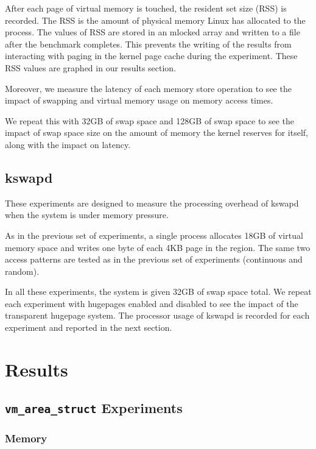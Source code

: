 \documentclass[twocolumn,11pt]{article}
\begin{document}
After each page of virtual memory is touched, the resident set size (RSS) is
recorded. The RSS is the
amount of physical memory Linux has allocated to the process. The
values of RSS are stored in an mlocked array and written to a file after the
benchmark completes. This prevents the writing of the results from interacting
with paging in the kernel page cache during the experiment. These RSS values are graphed in our
results section.

Moreover, we measure the latency of each memory store operation to see the
impact of swapping and virtual memory usage on memory access times.

We repeat this with 32GB of swap space and 128GB of swap space to see the
impact of swap space size on the amount of memory the kernel reserves for
itself, along with the impact on latency.

\subsection{kswapd}

These experiments are designed to measure the processing overhead of kswapd when
the system is under memory pressure.

As in the previous set of experiments, a single process allocates 18GB of virtual memory space and writes one byte of
each 4KB page in the region. The same two access patterns are tested as in the
previous set of experiments (continuous and random).

In all these experiments, the system is given 32GB of swap space total. We
repeat each experiment with hugepages enabled and disabled to see the impact of
the transparent hugepage system. The processor usage of kswapd is
recorded for each experiment and reported in the next section.


\section{Results}

\subsection{\texttt{vm\_area\_struct} Experiments}

\subsubsection{Memory}
\end{document}
